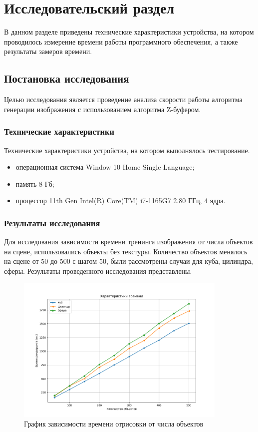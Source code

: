 \section{Исследовательский раздел}
В данном разделе приведены технические характеристики устройства, на котором проводилось измерение времени работы программного обеспечения, а также результаты замеров времени.

\subsection{Постановка исследования}

Целью исследования является проведение анализа скорости работы алгоритма генерации изображения с использованием алгоритма Z-буфером.

\subsubsection{Технические характеристики}

Технические характеристики устройства, на котором выполнялось тестирование.
\begin{itemize}
	\item операционная система Window 10 Home Single Language;
	\item память 8 Гб;
	\item процессор 11th Gen Intel(R) Core(TM) i7-1165G7 2.80 ГГц, 4 ядра.
\end{itemize}

\subsubsection{Результаты исследования}

Для исследования зависимости времени тренинга изображения от числа объектов на сцене, использовались объекты без текстуры. Количество объектов менялось на сцене от 50 до 500 с шагом 50, были рассмотрены случаи для куба, цилиндра, сферы. Результаты проведенного исследования представлены.

\begin{figure}[h]
	\centering
	\includegraphics[width=0.9\textwidth]{img/exp/exp1.png}
	\caption{График зависимости времени отрисовки от числа объектов}
	\label{fig:exp-1}
\end{figure}

